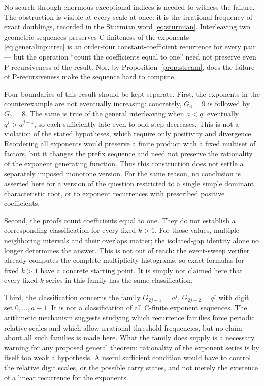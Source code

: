 \documentclass[11pt,letterpaper]{article}
\numberwithin{equation}{section}
\theoremstyle{definition}
\theoremstyle{remark}
\begin{document}
No search through enormous exceptional indices is needed to witness the
failure. The obstruction is visible at every scale at once: it is the
irrational frequency of exact doublings, recorded in the Sturmian word
\eqref{eq:sturmian}. Interleaving two geometric sequences preserves
C-finiteness of the exponents --- \eqref{eq:generalinputrec} is an
order-four constant-coefficient recurrence for every pair --- but the
operation ``count the coefficients equal to one'' need not preserve even
P-recursiveness of the result. Nor, by Proposition~\ref{prop:stream}, does
the failure of P-recursiveness make the sequence hard to compute.

Four boundaries of this result should be kept separate. First, the
exponents in the counterexample are not eventually increasing: concretely,
$G_6=9$ is followed by $G_7=8$. The same
is true of the general interleaving when $a<q$: eventually $q^j>a^{j+1}$,
so each sufficiently late even-to-odd step decreases. This is not a
violation of the stated hypotheses, which require only positivity and
divergence. Reordering all
exponents would preserve a finite product with a fixed multiset of
factors, but it changes the prefix sequence and need not preserve the
rationality of the exponent generating function. Thus this construction
does not settle a separately imposed monotone version. For the same
reason, no conclusion is asserted here for a version of the question
restricted to a single simple dominant characteristic root, or to
exponent recurrences with prescribed positive coefficients.

Second, the proofs count coefficients equal to one. They do not establish
a corresponding classification for every fixed $k>1$. For those values,
multiple neighboring intervals and their overlaps matter; the isolated-gap
identity alone no longer determines the answer. This is not out of reach:
the event-sweep verifier already computes the complete multiplicity
histograms, so exact formulas for fixed $k>1$ have a concrete starting
point. It is simply not claimed here that every fixed-$k$ series in this
family has the same classification.

Third, the classification concerns the family
$G_{2j+1}=a^j$, $G_{2j+2}=q^j$ with digit set $0,\ldots,a-1$.
It is not a classification of all C-finite exponent sequences.
The arithmetic mechanism suggests studying which recurrence families
force periodic relative scales and which allow irrational threshold
frequencies, but no claim about all such families is made here. What the
family does supply is a necessary warning for any proposed general
theorem: rationality of the exponent series is by itself too weak a
hypothesis. A useful sufficient condition would have to control the
relative digit scales, or the possible carry states, and not merely the
existence of a linear recurrence for the exponents.
\end{document}
